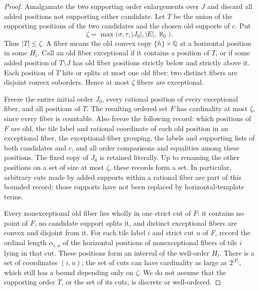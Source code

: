 \begin{proof}
Amalgamate the two supporting order enlargements over $J$ and discard
all added positions not supporting either candidate.  Let $T$ be the
union of the supporting positions of the two candidates and the
chosen old supports of $c$.  Put
\[
 \zeta=\max\bigl(\sigma,\tau,|J_0|,|E|,\aleph_0\bigr).
\]
Thus $|T|\leq\zeta$.  A fiber means the old convex copy
$\{h\}\times\mathbb Q$ at a horizontal position in some $H_i$.
Call an old fiber exceptional if it contains a position of $T$, or
if some added position of $T\setminus J$ has old fiber positions
strictly below and strictly above it.  Each position of $T$ hits or
splits at most one old fiber: two distinct fibers are disjoint convex
suborders.  Hence at most $\zeta$ fibers are exceptional.

Freeze the entire initial order $J_0$, every rational position of
every exceptional fiber, and all positions of $T$.  The resulting
ordered set $F$ has cardinality at most $\zeta$, since every fiber
is countable.  Also freeze the following record: which positions of
$F$ are old, the tile label and rational coordinate of each old
position in an exceptional fiber, the exceptional-fiber grouping,
the labels and supporting lists of both candidates and $c$, and all
order comparisons and equalities among these positions.  The fixed
copy of $J_0$ is retained literally.  Up to renaming the other
positions on a set of size at most $\zeta$, these records form a
set.  In particular, arbitrary cuts made by added supports within a
rational fiber are part of this bounded record; those supports have
not been replaced by horizontal-template terms.

Every nonexceptional old fiber lies wholly in one strict cut of
$F$: it contains no point of $F$, no candidate support splits it,
and distinct exceptional fibers are convex and disjoint from it.
For each tile label $i$ and strict cut $u$ of $F$, record the ordinal
length $\alpha_{i,u}$ of the horizontal positions of
nonexceptional fibers of tile $i$ lying in that cut.  These positions
form an interval of the well-order $H_i$.  There is a set of
coordinates $(i,u)$; the set of cuts can have cardinality as large
as $2^{|F|}$, which still has a bound depending only on $\zeta$.
We do not assume that the supporting order $T$, or the set of its
cuts, is discrete or well-ordered.


\end{proof}
